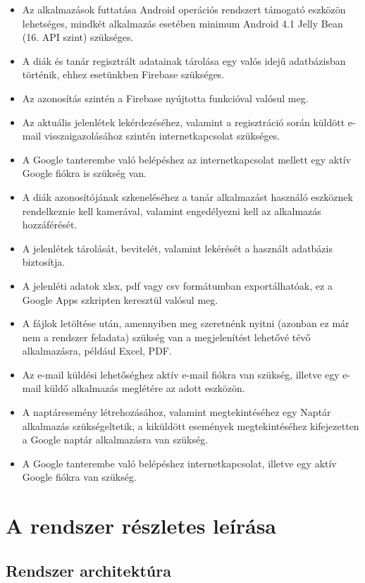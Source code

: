 \documentclass[12pt]{article}
\numberwithin{figure}{section}
\numberwithin{equation}{section}
\begin{document}
\begin{itemize}
	\item {Az alkalmazások futtatása Android operációs rendszert támogató eszközön lehetséges, mindkét alkalmazás esetében  minimum Android 4.1 Jelly Bean (16. API szint) szükséges.}
	\item {A diák és tanár regisztrált adatainak tárolása egy valós idejű adatbázisban történik, ehhez esetünkben Firebase szükséges.}
	\item{Az azonosítás szintén a Firebase nyújtotta funkcióval valósul meg.}
	\item {Az aktuális jelenlétek lekérdezéséhez, valamint a regisztráció során küldött e-mail visszaigazolásához szintén internetkapcsolat szükséges.}
	\item {A Google tanterembe való belépéshez az internetkapcsolat mellett egy aktív Google fiókra is szükség van.}
	\item {A diák azonosítójának szkeneléséhez a tanár alkalmazást használó eszköznek rendelkeznie kell kamerával, valamint engedélyezni kell az alkalmazás hozzáférését.}
	\item{A jelenlétek tárolását, bevitelét, valamint lekérését a használt adatbázis biztosítja.}
	\item{A jelenléti adatok xlsx, pdf vagy csv formátumban exportálhatóak, ez a Google Apps szkripten keresztül valósul meg.}
	\item{A fájlok letöltése után, amennyiben meg szeretnénk nyitni (azonban ez már nem a rendszer feladata) szükség van a megjelenítést lehetővé tévő alkalmazásra, például Excel, PDF.}
	\item{Az e-mail küldési lehetőséghez aktív e-mail fiókra van szükség, illetve egy e-mail küldő alkalmazás meglétére az adott eszközön.}
	\item{A naptáresemény létrehozásához, valamint megtekintéséhez egy Naptár alkalmazás szükségeltetik, a kiküldött események megtekintéséhez kifejezetten a Google naptár alkalmazásra van szükség.}
	\item {A Google tanterembe való belépéshez internetkapcsolat, illetve egy aktív Google fiókra van szükség.}\\
\end{itemize}


\section{A rendszer részletes leírása}
\subsection{Rendszer architektúra}
\end{document}
